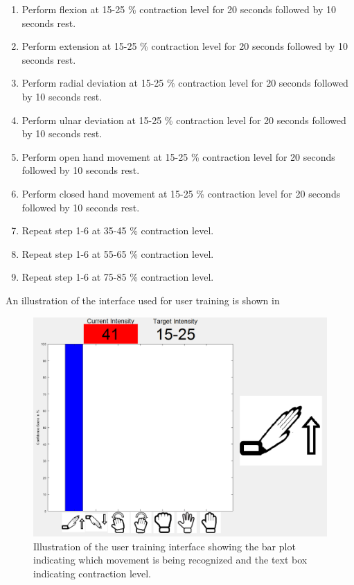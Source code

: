 \begin{enumerate}
	\item Perform flexion at 15-25 \% contraction level for 20 seconds followed by 10 seconds rest.
	\item Perform extension at 15-25 \% contraction level for 20 seconds followed by 10 seconds rest.
	\item Perform radial deviation at 15-25 \% contraction level for 20 seconds followed by 10 seconds rest.
	\item Perform ulnar deviation at 15-25 \% contraction level for 20 seconds followed by 10 seconds rest.
	\item Perform open hand movement at 15-25 \% contraction level for 20 seconds followed by 10 seconds rest.
	\item Perform closed hand movement at 15-25 \% contraction level for 20 seconds followed by 10 seconds rest.
	\item Repeat step 1-6 at 35-45 \% contraction level.
	\item Repeat step 1-6 at 55-65 \% contraction level.
	\item Repeat step 1-6 at 75-85 \% contraction level.
\end{enumerate} 

An illustration of the interface used for user training is shown in 

\begin{figure}[H]                 
	\includegraphics[width=.6\textwidth]{figures/xBackground/usertraincontrolGUI}  
	\caption{Illustration of the user training interface showing the bar plot indicating which movement is being recognized and the text box indicating contraction level.}
	\label{fig:usertraincontrolGUI} 
\end{figure}

